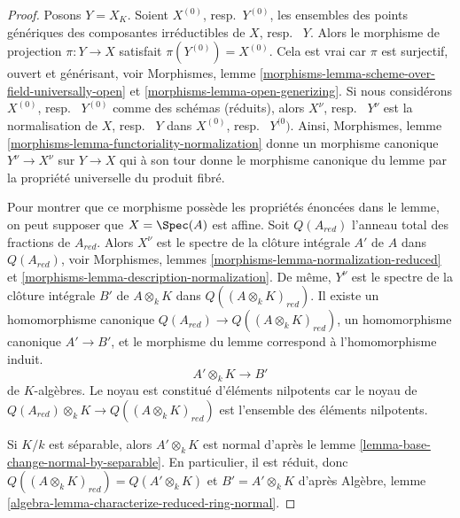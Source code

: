 \begin{proof}
 Posons $Y = X_K$. Soient $X^{(0)}$, resp.\ $Y^{(0)}$, les ensembles des points
génériques des composantes irréductibles de $X$, resp. \ $Y$. Alors le morphisme de projection 
$\pi : Y \to X$ satisfait $\pi(Y^{(0)}) = X^{(0)}$. Cela est vrai car 
$\pi$ est surjectif, ouvert et générisant,
voir Morphismes, lemme \ref{morphisms-lemma-scheme-over-field-universally-open} et 
\ref{morphisms-lemma-open-generizing}.
Si nous considérons $X^{(0)}$, resp. \ $Y^{(0)}$ comme des schémas (réduits), alors 
$X^\nu$, resp. \ $Y^\nu$ est la normalisation de $X$, resp. \ $Y$ dans 
$X^{(0)}$, resp. \ $Y^{(0})$.
Ainsi, Morphismes, lemme \ref{morphisms-lemma-functoriality-normalization}
 donne un morphisme canonique $Y^\nu \to X^\nu$ sur $Y \to X$ qui
à son tour donne le morphisme canonique du lemme par la
propriété universelle du produit fibré.

\medskip\noindent
 Pour montrer que ce morphisme possède les propriétés énoncées dans le lemme, on peut
supposer que $X = \Spec(A)$ est affine. Soit $Q(A_{red})$
l'anneau total des fractions de $A_{red}$. Alors $X^\nu$ est le spectre
de la clôture intégrale $A'$ de $A$ dans $Q(A_{red})$,
voir Morphismes, lemmes \ref{morphisms-lemma-normalization-reduced} et 
\ref{morphisms-lemma-description-normalization}.
De même, $Y^\nu$ est le spectre de la clôture intégrale $B'$ de 
$A \otimes_k K$ dans $Q((A \otimes_k K)_{red})$. Il existe un homomorphisme
canonique $Q(A_{red}) \to Q((A \otimes_k K)_{red})$, un homomorphisme canonique 
$A' \to B'$, et le morphisme du lemme correspond à l'homomorphisme induit. 
$$
A' \otimes_k K \longrightarrow B'
$$
 de $K$-algèbres. Le noyau est constitué d'éléments nilpotents
car le noyau de $Q(A_{red}) \otimes_k K \to Q((A \otimes_k K)_{red})$
 est l'ensemble des éléments nilpotents.

\medskip\noindent
 Si $K/k$ est séparable, alors $A' \otimes_k K$ est normal d'après
le lemme \ref{lemma-base-change-normal-by-separable}. En particulier,
il est réduit, donc $Q((A \otimes_k K)_{red}) = Q(A' \otimes_k K)$
 et $B' = A' \otimes_k K$
 d'après Algèbre, lemme \ref{algebra-lemma-characterize-reduced-ring-normal}.


\end{proof}
